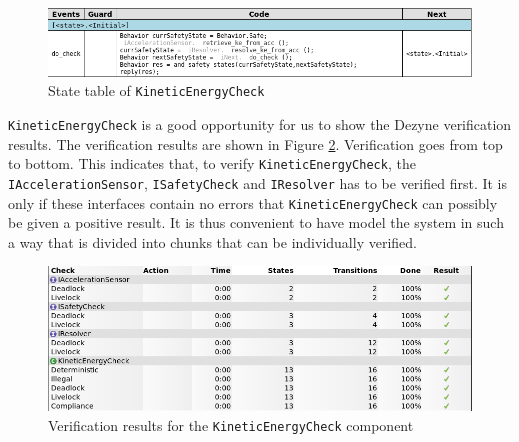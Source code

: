 \documentclass[12pt]{scrreprt}
\begin{document}
\begin{figure}[H]
    \centering
    \includegraphics[width=\textwidth]{Figures/results/modelling_figures/KineticEnergyCheck/KineticEnergyCheck_state_table.png}
    \caption{State table of \texttt{KineticEnergyCheck}}
    \label{fig:KineticEnergyCheck_state_table}
\end{figure}

\texttt{KineticEnergyCheck} is a good opportunity for us to show the Dezyne verification results. The verification results are shown in Figure \ref{fig:kineticenergycheck_verification}. Verification goes from top to bottom. This indicates that, to verify \texttt{KineticEnergyCheck}, the \texttt{IAccelerationSensor}, \texttt{ISafetyCheck} and \texttt{IResolver} has to be verified first. It is only if these interfaces contain no errors that \texttt{KineticEnergyCheck} can possibly be given a positive result. It is thus convenient to have model the system in such a way that is divided into chunks that can be individually verified.

\begin{figure}[H]
    \centering
    \includegraphics[width=\textwidth]{Figures/results/modelling_figures/KineticEnergyCheck/KineticEnergyCheck_verification.png}
    \caption{Verification results for the \texttt{KineticEnergyCheck} component}
    \label{fig:kineticenergycheck_verification}
\end{figure}
\end{document}
